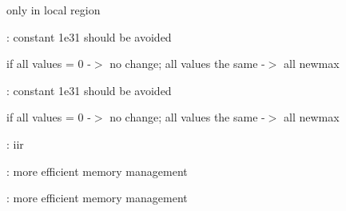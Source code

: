 
\begin{DoxyRefList}
\item[\label{todo__todo000005}%
\hypertarget{todo__todo000005}{}%
Member \hyperlink{classArray_a5e017adb9aa1e7c0b058f48d8cfcf8cf}{Array$<$ Type $>$\+:\+:center\+Of\+Gravity} (Type threshold, double $\ast$centerX, double $\ast$centerY)]only in local region  
\item[\label{todo__todo000001}%
\hypertarget{todo__todo000001}{}%
Member \hyperlink{classArray_ab72b95e6c465232e6704b00c0bc3f981}{Array$<$ Type $>$\+:\+:norm} (double)]\+: constant 1e31 should be avoided 

if all values = 0 -\/$>$ no change; all values the same -\/$>$ all newmax  
\item[\label{todo__todo000002}%
\hypertarget{todo__todo000002}{}%
Member \hyperlink{classArray_ae665ee475059fe98b5e8f7a1d63efd6e}{Array$<$ Type $>$\+:\+:norm\+High} (double)]\+: constant 1e31 should be avoided 

if all values = 0 -\/$>$ no change; all values the same -\/$>$ all newmax  
\item[\label{todo__todo000003}%
\hypertarget{todo__todo000003}{}%
Member \hyperlink{classArray_a4ee10b16eaa6c7c52704e43943ef38c8}{Array$<$ Type $>$\+:\+:smooth} (int halfwidthx, int halfwidthy)]\+: iir 

\+: more efficient memory management  
\item[\label{todo__todo000004}%
\hypertarget{todo__todo000004}{}%
Member \hyperlink{classArray_a121e8b26d85e237bdc46375178e6cab2}{Array$<$ Type $>$\+:\+:smooth\+Fast} (int halfwidthx, int halfwidthy)]\+: more efficient memory management 
\end{DoxyRefList}